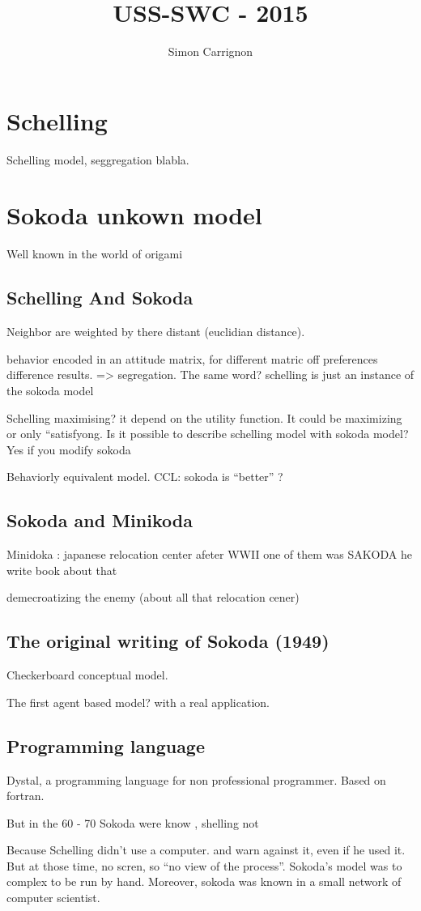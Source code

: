\documentclass[a4paper]{article}
\title{USS-SWC - 2015}
\author{Simon Carrignon}
\begin{document}
\section{Schelling}
Schelling model, seggregation blabla.

\section{Sokoda unkown model}
Well known in the world of origami


\subsection{Schelling And Sokoda}
Neighbor are weighted by there distant  (euclidian distance).

behavior encoded in an attitude matrix, for different matric off preferences difference results.
=> segregation. The same word? schelling is just an instance of the sokoda model


Schelling maximising? it depend on the utility function. It could be maximizing or only ``satisfyong.
Is it possible to describe schelling model with sokoda model? Yes if you modify sokoda

Behaviorly equivalent model. CCL: sokoda is ``better'' ?

\subsection{Sokoda and Minikoda}
Minidoka : japanese relocation center afeter WWII one of them was SAKODA he write book about that

demecroatizing the enemy (about all that relocation cener)
\subsection{The original writing of Sokoda (1949)}
Checkerboard conceptual model.

The first agent based model? with a real application.
\subsection{Programming language}
Dystal, a programming language for non professional programmer. Based on fortran.

But in the 60 - 70 Sokoda were know , shelling not

Because Schelling didn't use a computer. and warn against it, even if he used it. But at those time, no scren, so ``no view of the process''.
Sokoda's model was to complex to be run by hand. Moreover, sokoda was known in a small network of computer scientist.
\end{document}
